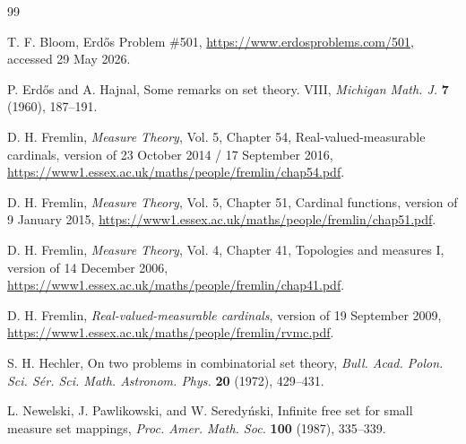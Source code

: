 \documentclass{amsart}
\theoremstyle{plain}
\theoremstyle{definition}
\begin{document}
\begin{thebibliography}{99}

T. F. Bloom,
Erd\H{o}s Problem \#501,
\url{https://www.erdosproblems.com/501},
accessed 29 May 2026.

P. Erd\H{o}s and A. Hajnal,
Some remarks on set theory. VIII,
\emph{Michigan Math. J.} \textbf{7} (1960), 187--191.

D. H. Fremlin,
\emph{Measure Theory}, Vol. 5, Chapter 54, Real-valued-measurable cardinals,
version of 23 October 2014 / 17 September 2016,
\url{https://www1.essex.ac.uk/maths/people/fremlin/chap54.pdf}.

D. H. Fremlin,
\emph{Measure Theory}, Vol. 5, Chapter 51, Cardinal functions,
version of 9 January 2015,
\url{https://www1.essex.ac.uk/maths/people/fremlin/chap51.pdf}.

D. H. Fremlin,
\emph{Measure Theory}, Vol. 4, Chapter 41, Topologies and measures I,
version of 14 December 2006,
\url{https://www1.essex.ac.uk/maths/people/fremlin/chap41.pdf}.

D. H. Fremlin,
\emph{Real-valued-measurable cardinals},
version of 19 September 2009,
\url{https://www1.essex.ac.uk/maths/people/fremlin/rvmc.pdf}.

S. H. Hechler,
On two problems in combinatorial set theory,
\emph{Bull. Acad. Polon. Sci. S\'er. Sci. Math. Astronom. Phys.} \textbf{20} (1972), 429--431.

L. Newelski, J. Pawlikowski, and W. Seredy\'nski,
Infinite free set for small measure set mappings,
\emph{Proc. Amer. Math. Soc.} \textbf{100} (1987), 335--339.

\end{thebibliography}
\end{document}
